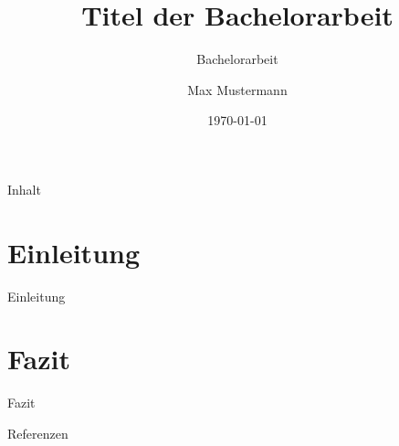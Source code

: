 \documentclass[9pt,xcolor=dvipsnames,]{beamer}
\title{Titel der Bachelorarbeit}
\subtitle{Bachelorarbeit}
\author{Max Mustermann}
\date{\today}
\institute[TU Dortmund]{Mustererkennung,\\Informatik XII, Technische Universität Dortmund}
\begin{document}
\maketitle

\begin{frame}{Inhalt}
\tableofcontents
\end{frame}


\section{Einleitung}
\begin{frame}{Einleitung}
    
\end{frame}

\section{Fazit}
\begin{frame}{Fazit}
    
\end{frame}
\begin{frame}[allowframebreaks]{Referenzen}
	\printbibliography
\end{frame}
\end{document}
